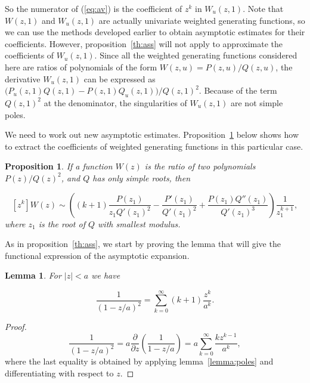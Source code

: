 \documentclass{article}
\newtheorem{lemma}{Lemma}
\newtheorem{proposition}{Proposition}
\begin{document}
So the numerator of (\ref{eq:av}) is the coefficient of $z^k$ in
$W_u(z,1)$. Note that $W(z,1)$ and $W_u(z,1)$ are actually univariate
weighted generating functions, so we can use the methods developed earlier
to obtain asymptotic estimates for their coefficients. However,
proposition~\ref{th:ass} will not apply to approximate the coefficients of
$W_u(z,1)$. Since all the weighted generating functions considered here
are ratios of polynomials of the form $W(z,u) = P(z,u)/Q(z,u)$, the
derivative $W_u(z,1)$ can be expressed as $\big(P_u(z,1)Q(z,1) -
P(z,1)Q_u(z,1)\big)/Q(z,1)^2$. Because of the term $Q(z,1)^2$ at the
denominator, the singularities of $W_u(z,1)$ are not simple poles.

We need to work out new asymptotic estimates. Proposition~\ref{th:ass2}
below shows how to extract the coefficients of weighted generating
functions in this particular case.




\begin{proposition}
\label{th:ass2}
If a function $W(z)$ is the ratio of two polynomials $P(z)/Q(z)^2$, and
$Q$ has only simple roots, then

\begin{equation}
\label{eq:ass2}
[z^k]W(z) \sim
\left( (k+1)\frac{P(z_1)}{z_1 Q'(z_1)^2} - \frac{P'(z_1)}{Q'(z_1)^2} +
\frac{P(z_1)Q''(z_1)}{Q'(z_1)^3} \right)
\frac{1}{z_1^{k+1}},
\end{equation}
where $z_1$ is the root of $Q$ with smallest \textit{modulus}.
\end{proposition}

As in proposition~\ref{th:ass}, we start by proving the lemma that will
give the functional expression of the asymptotic expansion.

\begin{lemma}
\label{lemma:poles2}
For $|z| < a$ we have

\begin{equation}
\label{eq:poles2}
\frac{1}{(1-z/a)^2} = \sum_{k=0}^\infty (k+1)\frac{z^k}{a^k}.
\end{equation}
\end{lemma}

\begin{proof}
\begin{equation*}
\frac{1}{(1-z/a)^2} = a \frac{\partial}{\partial z}
  \left( \frac{1}{1-z/a} \right)
= a \sum_{k=0}^\infty \frac{kz^{k-1}}{a^k},
\end{equation*}
where the last equality is obtained by applying lemma~\ref{lemma:poles}
and differentiating with respect to $z$.
\end{proof}
\end{document}
